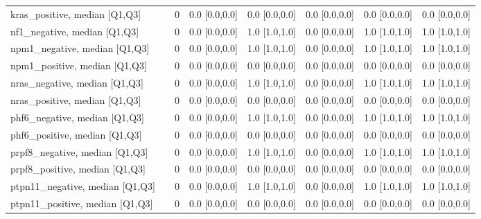 \begin{tabular}{llllllll}
kras\_positive, median [Q1,Q3] &    &                    0 &     0.0 [0.0,0.0] &           0.0 [0.0,0.0] &     0.0 [0.0,0.0] &             0.0 [0.0,0.0] &             0.0 [0.0,0.0] \\
nf1\_negative, median [Q1,Q3] &    &                    0 &     0.0 [0.0,0.0] &           1.0 [1.0,1.0] &     0.0 [0.0,0.0] &             1.0 [1.0,1.0] &             1.0 [1.0,1.0] \\
npm1\_negative, median [Q1,Q3] &    &                    0 &     0.0 [0.0,0.0] &           1.0 [1.0,1.0] &     0.0 [0.0,0.0] &             1.0 [1.0,1.0] &             1.0 [1.0,1.0] \\
npm1\_positive, median [Q1,Q3] &    &                    0 &     0.0 [0.0,0.0] &           0.0 [0.0,0.0] &     0.0 [0.0,0.0] &             0.0 [0.0,0.0] &             0.0 [0.0,0.0] \\
nras\_negative, median [Q1,Q3] &    &                    0 &     0.0 [0.0,0.0] &           1.0 [1.0,1.0] &     0.0 [0.0,0.0] &             1.0 [1.0,1.0] &             1.0 [1.0,1.0] \\
nras\_positive, median [Q1,Q3] &    &                    0 &     0.0 [0.0,0.0] &           0.0 [0.0,0.0] &     0.0 [0.0,0.0] &             0.0 [0.0,0.0] &             0.0 [0.0,0.0] \\
phf6\_negative, median [Q1,Q3] &    &                    0 &     0.0 [0.0,0.0] &           1.0 [1.0,1.0] &     0.0 [0.0,0.0] &             1.0 [1.0,1.0] &             1.0 [1.0,1.0] \\
phf6\_positive, median [Q1,Q3] &    &                    0 &     0.0 [0.0,0.0] &           0.0 [0.0,0.0] &     0.0 [0.0,0.0] &             0.0 [0.0,0.0] &             0.0 [0.0,0.0] \\
prpf8\_negative, median [Q1,Q3] &    &                    0 &     0.0 [0.0,0.0] &           1.0 [1.0,1.0] &     0.0 [0.0,0.0] &             1.0 [1.0,1.0] &             1.0 [1.0,1.0] \\
prpf8\_positive, median [Q1,Q3] &    &                    0 &     0.0 [0.0,0.0] &           0.0 [0.0,0.0] &     0.0 [0.0,0.0] &             0.0 [0.0,0.0] &             0.0 [0.0,0.0] \\
ptpn11\_negative, median [Q1,Q3] &    &                    0 &     0.0 [0.0,0.0] &           1.0 [1.0,1.0] &     0.0 [0.0,0.0] &             1.0 [1.0,1.0] &             1.0 [1.0,1.0] \\
ptpn11\_positive, median [Q1,Q3] &    &                    0 &     0.0 [0.0,0.0] &           0.0 [0.0,0.0] &     0.0 [0.0,0.0] &             0.0 [0.0,0.0] &             0.0 [0.0,0.0] \\

\end{tabular}
